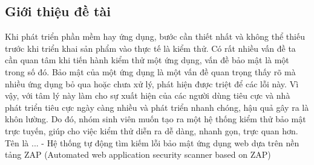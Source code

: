 \subsection{Giới thiệu đề tài}
\tab Khi phát triển phần mềm hay ứng dụng, bước cần thiết nhất và không thể thiếu
trước khi triển khai sản phẩm vào thực tế là kiểm thử. Có rất nhiều vấn đề ta cần
quan tâm khi tiến hành kiểm thử một ứng dụng, vấn đề bảo mật là một trong số đó. Bảo mật
của một ứng dụng là một vấn đề quan trọng thấy rõ mà nhiều ứng dụng bỏ qua hoặc chưa xử lý, phát hiện
được triệt để các lỗi này. Vì vậy, với tâm lý này làm cho sự xuất hiện của các người dùng tiêu cực và
nhà phát triển tiêu cực ngày càng nhiều và phát triển nhanh chóng, hậu quả gây ra là khôn lường.
Do đó, nhóm sinh viên muốn tạo ra một hệ thống kiểm thử bảo mật trực tuyến, giúp cho việc kiểm thử diễn ra dễ dàng,
nhanh gọn, trực quan hơn. Tên là ... - Hệ thống tự động tìm kiếm lỗi bảo mật ứng dụng web dựa trên nền tảng ZAP (Automated web application security scanner based on ZAP)